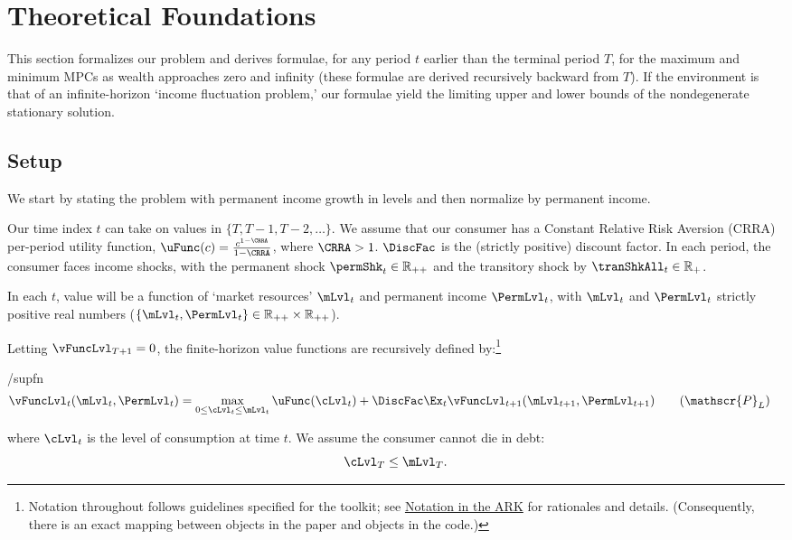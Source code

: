 \documentclass[BufferStockTheory]{subfiles}
\begin{document}
\hypertarget{The-Problem}{}
\section{Theoretical Foundations}

This section formalizes our problem and derives formulae, for any period $t$ earlier than the terminal period $T$, for the maximum and minimum MPCs as wealth approaches zero and infinity (these formulae are derived recursively backward from $T$).  If the environment is that of an infinite-horizon `income fluctuation problem,' our formulae yield the limiting upper and lower bounds of the nondegenerate stationary solution.

\label{sec:Foundations}
\subsection{Setup}\label{subsec:Setup}

We start by stating the problem with permanent income growth in levels and then normalize by permanent income.

Our time index $t$ can take on values in $\{T,T-1,T-2,\dots \}$. We assume that our consumer has a Constant Relative Risk Aversion (CRRA) per-period utility function, $\uFunc(c)=\frac{c^{1-\CRRA}}{1-\CRRA}$, where $\CRRA>1$. $\DiscFac$ is the (strictly positive) discount factor. In each period, the consumer faces income shocks, with the permanent shock $\permShk_{t} \in \mathbb{R}_{++}$ and the transitory shock by $\tranShkAll_{t} \in \mathbb{R}_{+}$. 

In each $t$, value will be a function of `market resources' $\mLvl_{t}$ and permanent income $\PermLvl_{t}$, with $\mLvl_{t}$ and $\PermLvl_{t}$ strictly positive real numbers ($\{\mLvl_{t} , \PermLvl_{t}\} \in \mathbb{R}_{++} \times \mathbb{R}_{++}$).

Letting $\vFuncLvl_{T+1} = 0$, the finite-horizon value functions are recursively defined by:\footnote{Notation throughout follows guidelines specified for the {\ARKurl} toolkit; see \href{https://github.com/econ-ark/HARK/blob/master/Documentation/NARK/NARK.pdf}{Notation in the ARK} for rationales and details.  (Consequently, there is an exact mapping between objects in the paper and objects in the code.)}
%
\begin{verbatimwrite}{\EqDir/supfn}
  \begin{align}\label{eq:levelRecProblem}
    \vFuncLvl_{t}(\mLvl_{t}, \PermLvl_{t}) & = \max_{0 \leq\cLvl_{t} \leq \mLvl_{t}} \uFunc(\cLvl_{t}) + \DiscFac \Ex_{t}\vFuncLvl_{t+1}(\mLvl_{t+1}, \PermLvl_{t+1}) \tag{$\mathscr{P}_{L}$}
  \end{align}
\end{verbatimwrite}

where $\cLvl_{t}$ is the level of consumption at time $t$. We assume the consumer cannot die in debt:
%
\begin{equation}\label{eq:NoDebtAtDeath}
\cLvl_{T} \leq  \mLvl_{T} .
\end{equation}
\end{document}
